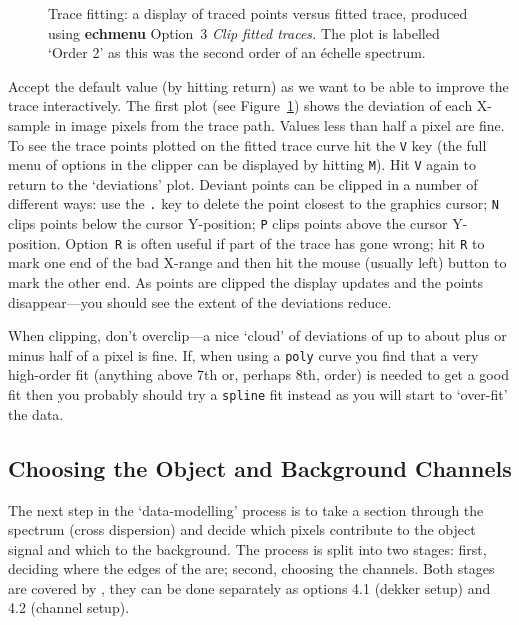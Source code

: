 \documentclass[twoside,11pt]{starlink}
\providecommand{\scspec}[2]{#1}
\begin{document}
\begin{figure}
\begin{center}
  \parbox{140mm}{
  \caption{Trace fitting: a display of traced points versus fitted trace,
           produced using \textbf{echmenu} Option~3 {\sl Clip fitted
	   traces.} The plot is labelled `Order 2' as this was the
	   second order of an \'{e}chelle spectrum.}
    \label{fi_trace_fit}
  }
\end{center}
\end{figure}

Accept the default value (by hitting return) as we want to be able to
improve the trace interactively.
The first plot (see \scspec{Figure~\ref{fi_trace_fit}}
{the figure above}) shows the deviation of each X-sample in image
pixels from the trace path.
Values less than half a pixel are fine.  To see the
trace points plotted on the fitted trace curve hit the \verb+V+ key (the
full menu of options in the clipper can be displayed by hitting \verb+M+).
Hit \verb+V+ again to return to the `deviations' plot.  Deviant points can
be clipped in a number of different ways: use the \verb+.+ key to delete
the point closest to the graphics cursor; \verb+N+ clips points below the
cursor Y-position; \verb+P+ clips points above the cursor Y-position.
Option~\verb+R+ is often useful if part of the trace has gone wrong;
hit \verb+R+ to mark one end of the bad X-range and then hit the mouse
(usually left) button to mark the other end.
As points are clipped the display updates and the points
disappear\scspec{---}{ - }you should see the extent of the
deviations reduce.

When clipping, don't overclip\scspec{---}{ - }a nice `cloud' of deviations
of up to about plus or minus half of a pixel is fine.  If, when using a
\verb+poly+ curve you find that a very high-order fit (anything above 7th or,
perhaps 8th, order) is needed to get a good fit then you probably should
try a \verb+spline+ fit instead as you will start to `over-fit' the data.


\subsection{Choosing the Object and Background Channels}

The next step in the `data-modelling' process is to take a section through
the spectrum (cross dispersion) and decide which pixels contribute to the
object signal and which to the background.  The process is split into two
stages: first, deciding where the edges of the 
are; second, choosing the channels.  Both stages are covered by
,
they can be done separately as options 4.1 (dekker setup) and 4.2
(channel setup).
\end{document}
